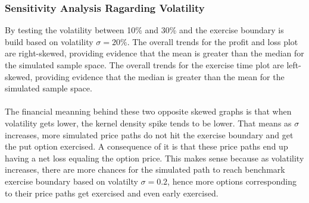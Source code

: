 \documentclass[12pt]{article}
\begin{document}
\subsubsection{Sensitivity Analysis Ragarding Volatility}
By testing the volatility between 10\% and 30\% and the exercise boundary is build based on volatility $\sigma = 20\%$. The overall trends for the profit and loss plot are right-skewed, 
providing evidence that the mean is greater than the median for the simulated sample space. The overall trends for the exercise time plot are left-skewed, providing evidence that the median is greater 
than the mean for the simulated sample space.\\\\
The financial meanning behind these two opposite skewed graphs is that when volatility gets lower, the kernel density spike tends to be lower. 
That means as $\sigma$ increases, more simulated price paths do not hit the exercise boundary and get the put option exercised. A consequence of it is that these price paths end up having a net loss equaling 
the option price. This makes sense because as volatility increases, there are more chances for the simulated path to reach benchmark exercise boundary based on volatilty $\sigma=0.2$, hence more options corresponding to 
their price paths get exercised and even early exercised.
\end{document}
